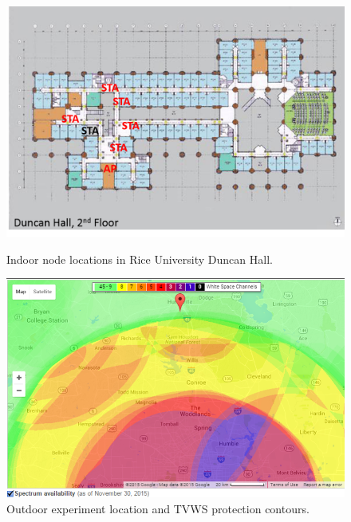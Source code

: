 \begin{figure}[ht!]
\centering
\begin{minipage}{0.49\textwidth}
\centering
\includegraphics[width=1.0\linewidth]{figs/meas/duncan_layout}
\caption{Indoor node locations in Rice University Duncan Hall.}
\label{fig_mobile_indoor_location}
\end{minipage}
\hfill
\begin{minipage}{0.49\textwidth}
\centering
\includegraphics[width=1.0\linewidth]{figs/meas/protection_contours_trim}
\caption{Outdoor experiment location and \ac{TVWS} protection contours.}
\label{fig_mobile_outdoor_location}
\end{minipage}
\end{figure}

